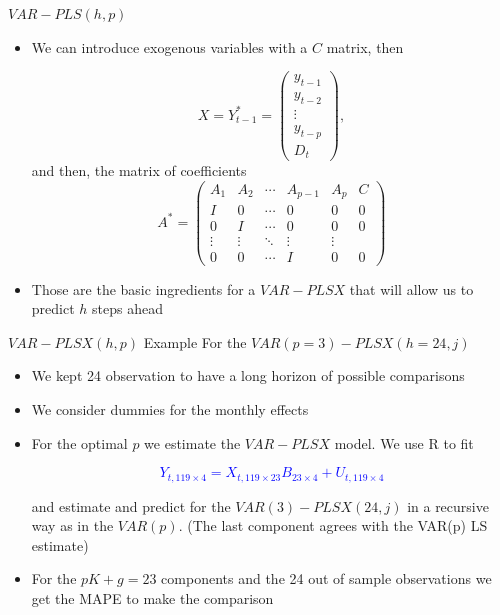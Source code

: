 \documentclass{beamer}
\newcommand{\?}{?`}
\begin{document}
\begin{frame}{$VAR-PLS(h,p)$}
  \begin{itemize}
  \item We can introduce exogenous variables with a $C$ matrix, then
      \begin{footnotesize}
    \begin{displaymath}
      X=Y_{t-1}^{*}=\left(
        \begin{array}{c}
          y_{t-1} \\
          y_{t-2} \\
          \vdots \\
          y_{t-p} \\
          D_t
        \end{array}
      \right),
    \end{displaymath}
    and then, the matrix of coefficients
    \begin{displaymath}
      A^{*}=\left(
        \begin{array}{cccccc}
          A_1 & A_2 & \cdots & A_{p-1} & A_p & C \\
          I & 0 & \cdots & 0 & 0 & 0 \\
          0 & I & \cdots & 0 & 0 & 0 \\
          \vdots & \vdots & \ddots & \vdots & \vdots \\
          0 & 0 & \cdots & I & 0 & 0
        \end{array}
        \right)
    \end{displaymath}
    \end{footnotesize}
  \item Those are the basic ingredients for a  $VAR-PLSX$ that will allow us to predict $h$ steps ahead
  \end{itemize}
\end{frame}

\begin{frame}{$VAR-PLSX(h,p)$ Example}
 For the $VAR(p=3)-PLSX(h=24,j)$
  \begin{itemize}
  \item We kept 24 observation to have a long horizon of possible comparisons
  \item We consider dummies for the monthly effects
  \item For the optimal $p$ we estimate the $VAR-PLSX$ model.  We use R to fit

 \textcolor{blue} {$$Y_{t,119\times 4} = X_{t,119\times 23} B_{23\times 4}+ U_{t,119\times 4}$$}

and estimate and predict for the $VAR(3)-PLSX(24,j)$ in a recursive way as in the $VAR(p)$. (The last component agrees with the VAR(p) LS estimate)
  \item For the $pK+g=23$ components and the 24 out of
  sample observations we get the MAPE to make the comparison
  \end{itemize}
\end{frame}
\end{document}
